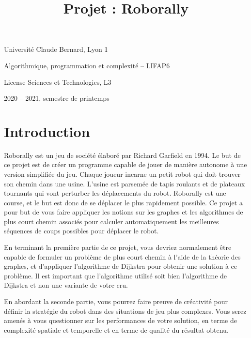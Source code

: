 \documentclass[a4paper]{article}
\title{Projet : Roborally}
\author{}
\date{}
\newcommand{\li}{\linewidth}
\begin{document}
\noindent
\begin{minipage}{0.5\li}
  Université Claude Bernard, Lyon 1

  Algorithmique, programmation et complexité -- LIFAP6
\end{minipage}
\hfill
\begin{minipage}{0.4\li}
  \raggedright
  License Sciences et Technologies, L3

  2020 -- 2021, semestre de printemps
\end{minipage}

{\let\newpage\relax\maketitle}

\section{Introduction}

\paragraph{}Roborally est un jeu de société élaboré par Richard Garfield en
1994. Le but de ce projet est de créer un programme capable de jouer de manière
autonome à une version simplifiée du jeu. Chaque joueur incarne un petit robot
qui doit trouver son chemin dans une usine. L'usine est parsemée de tapis
roulants et de plateaux tournants qui vont perturber les déplacements du robot.
Roborally est une course, et le but est donc de se déplacer le plus rapidement
possible. Ce projet a pour but de vous faire appliquer les notions sur les
graphes et les algorithmes de plus court chemin associés pour calculer
automatiquement les meilleures séquences de coups possibles pour déplacer le
robot.

En terminant la première partie de ce projet, vous devriez normalement être
capable de formuler un problème de plus court chemin à l'aide de la théorie des
graphes, et d'appliquer l'algorithme de Dijkstra pour obtenir une solution à ce
problème. Il est important que l'algorithme utilisé soit bien l'algorithme de
Dijkstra et non une variante de votre cru.

En abordant la seconde partie, vous pourrez faire preuve de créativité pour
définir la stratégie du robot dans des situations de jeu plus complexes. Vous
serez amenés à vous questionner sur les performances de votre solution, en terme
de complexité spatiale et temporelle et en terme de qualité du résultat obtenu.
\end{document}
